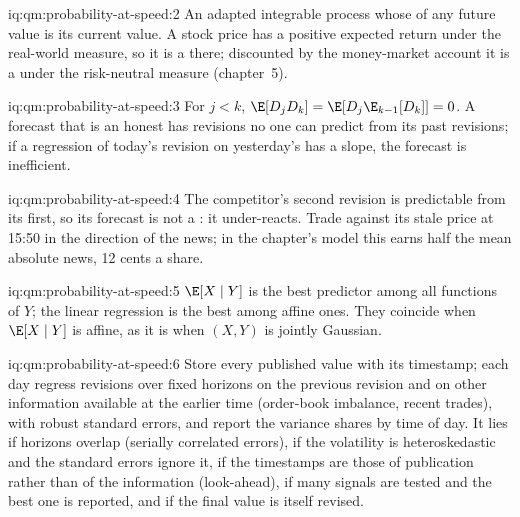 \begin{solution}{iq:qm:probability-at-speed:2}
An adapted integrable process whose  of any future value is its
current value. A stock price has a positive expected return under the real-world measure,
so it is a  there; discounted by the money-market account it is a 
under the risk-neutral measure (chapter~5).
\end{solution}

\begin{solution}{iq:qm:probability-at-speed:3}
For $j < k$, $\E[D_jD_k] = \E[D_j\E_{k-1}[D_k]] = 0$. A forecast that is an honest  has revisions no one can predict from its past revisions; if a regression of
today's revision on yesterday's has a slope, the forecast is inefficient.
\end{solution}

\begin{solution}{iq:qm:probability-at-speed:4}
The competitor's second revision is predictable from its first, so its forecast is not a
: it under-reacts. Trade against its stale price at 15:50 in the direction of the
news; in the chapter's model this earns half the mean absolute news, 12 cents a share.
\end{solution}

\begin{solution}{iq:qm:probability-at-speed:5}
$\E[X \mid Y]$ is the best predictor among all functions of $Y$; the linear regression is the
best among affine ones. They coincide when $\E[X \mid Y]$ is affine, as it is when $(X, Y)$ is
jointly Gaussian.
\end{solution}

\begin{solution}{iq:qm:probability-at-speed:6}
Store every published value with its timestamp; each day regress revisions over fixed
horizons on the previous revision and on other information available at the earlier time
(order-book imbalance, recent trades), with robust standard errors, and report the variance
shares by time of day. It lies if horizons overlap (serially correlated errors), if the
volatility is heteroskedastic and the standard errors ignore it, if the timestamps are those
of publication rather than of the information (look-ahead), if many signals are tested and
the best one is reported, and if the final value is itself revised.
\end{solution}
